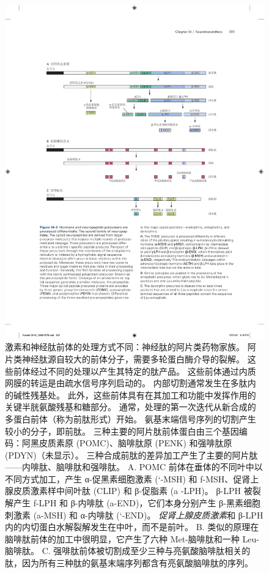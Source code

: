 \begin{figure}[htbp]
	\centering
	\includegraphics[width=0.85\linewidth]{chap16/fig_16_2}
	\caption{激素和神经肽前体的处理方式不同：神经肽的阿片类药物家族。 阿片类神经肽源自较大的前体分子，需要多轮蛋白酶介导的裂解。 这些前体经过不同的处理以产生其特定的肽产品。 这些前体通过内质网膜的转运是由疏水信号序列启动的。 内部切割通常发生在多肽内的碱性残基处。 此外，这些前体具有在其加工和功能中发挥作用的关键半胱氨酸残基和糖部分。 通常，处理的第一次迭代从新合成的多蛋白前体（称为前肽形式）开始。 氨基末端信号序列的切割产生较小的分子，即前肽。 三种主要的阿片肽前体蛋白由三个基因编码：阿黑皮质素原 (POMC)、脑啡肽原 (PENK) 和强啡肽原 (PDYN)（未显示）。 三种合成前肽的差异加工产生了主要的阿片肽——内啡肽、脑啡肽和强啡肽。 A. POMC 前体在垂体的不同叶中以不同方式加工，产生 α-促黑素细胞激素 (`-MSH) 和 f-MSH、促肾上腺皮质激素样中间叶肽 (CLIP) 和 β-促脂素 (a -LPH)。 β-LPH 被裂解产生 f-LPH 和 β-内啡肽 (a-END)，它们本身分别产生 β-黑素细胞刺激素 (a-MSH) 和 α-内啡肽 (`-END)。 \textit{促肾上腺皮质激素}和 β-LPH 内的内切蛋白水解裂解发生在中叶，而不是前叶。 B. 类似的原理在脑啡肽前体的加工中很明显，它产生了六种 Met-脑啡肽和一种 Leu-脑啡肽。 C. 强啡肽前体被切割成至少三种与亮氨酸脑啡肽相关的肽，因为所有三种肽的氨基末端序列都含有亮氨酸脑啡肽的序列。}
	\label{fig:16_2}
\end{figure}


